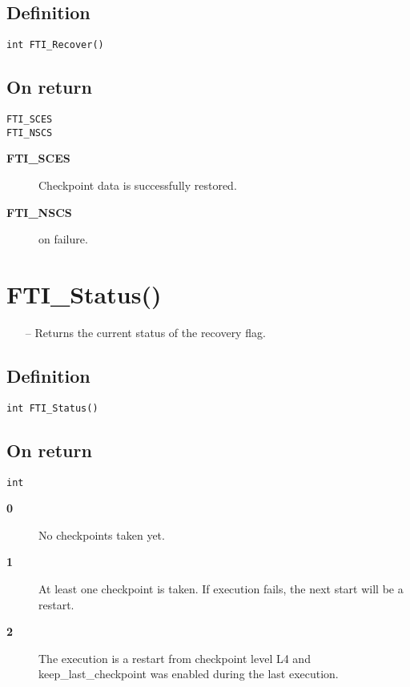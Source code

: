\documentclass{refrep}
\begin{document}
\subsection*{Definition}
\begin{lstlisting}[frame=single]
int FTI_Recover()
\end{lstlisting}
\subsection*{On return}
\begin{lstlisting}[frame=single]
FTI_SCES
FTI_NSCS
\end{lstlisting}
\begin{description}
\item[\textbf{FTI\_SCES}] Checkpoint data is successfully restored.
\item[\textbf{FTI\_NSCS}] on failure.
\end{description}
\newpage
\section{\asciifamily FTI\_Status()}\label{sec:ftisnapshot}
\begin{framed}
\begin{itemize}
\item[--] Returns the current status of the recovery flag.
\end{itemize}
\end{framed}
\subsection*{Definition}
\begin{lstlisting}[frame=single]
int FTI_Status()
\end{lstlisting}
\subsection*{On return}
\begin{lstlisting}[frame=single]
int
\end{lstlisting}
\begin{description}
\item[\textbf{0}] No checkpoints taken yet.
\item[\textbf{1}] At least one checkpoint is taken. If execution fails, the next start will be a restart.
\item[\textbf{2}] The execution is a restart from checkpoint level L4 and keep\_last\_checkpoint was enabled during the last execution.
\end{description}
\newpage
\end{document}
